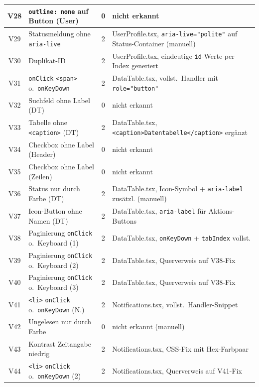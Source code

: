 \begin{longtable}{|c|p{5.0cm}|c|p{5.4cm}|}
V28  & \texttt{outline: none} auf Button (User)     & 0 & nicht erkannt \\ \hline
V29  & Statusmeldung ohne \texttt{aria-live}        & 2 & UserProfile.tsx, \texttt{aria-live="polite"} auf Status-Container (manuell) \\ \hline
V30  & Duplikat-ID                                  & 2 & UserProfile.tsx, eindeutige \texttt{id}-Werte per Index generiert \\ \hline
V31  & \texttt{onClick} \texttt{<span>} o.\ \texttt{onKeyDown} & 2 & DataTable.tsx, vollst.\ Handler mit \texttt{role="button"} \\ \hline
V32  & Suchfeld ohne Label (DT)                     & 0 & nicht erkannt \\ \hline
V33  & Tabelle ohne \texttt{<caption>} (DT)         & 2 & DataTable.tsx, \texttt{<cap\-tion>Daten\-tabelle</cap\-tion>} ergänzt \\ \hline
V34  & Checkbox ohne Label (Header)                 & 0 & nicht erkannt \\ \hline
V35  & Checkbox ohne Label (Zeilen)                 & 0 & nicht erkannt \\ \hline
V36  & Status nur durch Farbe (DT)                  & 2 & DataTable.tsx, Icon-Symbol + \texttt{aria-label} zusätzl. (manuell) \\ \hline
V37  & Icon-Button ohne Namen (DT)                  & 2 & DataTable.tsx, \texttt{aria-label} für Aktions-Buttons \\ \hline
V38  & Paginierung \texttt{onClick} o.\ Keyboard (1) & 2 & DataTable.tsx, \texttt{onKeyDown} + \texttt{tabIndex} vollst. \\ \hline
V39  & Paginierung \texttt{onClick} o.\ Keyboard (2) & 2 & DataTable.tsx, Querverweis auf V38-Fix \\ \hline
V40  & Paginierung \texttt{onClick} o.\ Keyboard (3) & 2 & DataTable.tsx, Querverweis auf V38-Fix \\ \hline
V41  & \texttt{<li>} \texttt{onClick} o.\ \texttt{onKeyDown} (N.) & 2 & Notifications.tsx, vollst.\ Handler-Snippet \\ \hline
V42  & Ungelesen nur durch Farbe                    & 0 & nicht erkannt (manuell) \\ \hline
V43  & Kontrast Zeitangabe niedrig                  & 2 & Notifications.tsx, \ac{CSS}-Fix mit Hex-Farbpaar \\ \hline
V44  & \texttt{<li>} \texttt{onClick} o.\ \texttt{onKeyDown} (2) & 2 & Notifications.tsx, Querverweis auf V41-Fix \\ \hline

\end{longtable}
